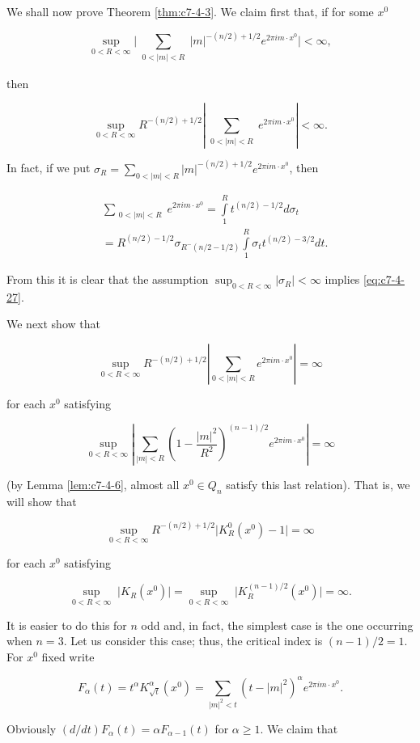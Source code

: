 We shall now prove Theorem \ref{thm:c7-4-3}. We claim first that, if for some $x^{0}$

\[
\sup_{0<R<\infty}\bigg|\sum_{\substack{0<|m|<R}}\left|m\right|^{-(n/2)+1/2}e^{2\pi i m\cdot x^{0}}\bigg|<\infty,
\]

then

\begin{equation}\label{eq:c7-4-27}
\sup_{0<R<\infty}R^{-(n/2)+1/2}\left|\sum_{\substack{0<|m|<R}}e^{2\pi i m\cdot x^{0}}\right|<\infty.
\end{equation}

In fact, if we put $\sigma_R = \sum_{0 < |m| < R} |m|^{-(n/2)+1/2}e^{2\pi im \cdot x^0}$, then

\[
\begin{aligned}&\sum_{\substack{0<|m|<R}}e^{2\pi i m\cdot x^{0}}=\int\limits_{1}^{R}t^{(n/2)-1/2}d\sigma_{t}\\&=R^{(n/2)-1/2}\sigma_{R^{-}(n/2-1/2)}\int\limits_{1}^{R}\sigma_{t}t^{(n/2)-3/2}d t.\end{aligned}
\]

From this it is clear that the assumption $\sup_{0<R<\infty}|\sigma_R|<\infty$ implies \eqref{eq:c7-4-27}.

We next show that

\[
\sup_{0<R<\infty}R^{-(n/2)+1/2}\left|\sum_{0<|m|<R}e^{2\pi i m\cdot x^{0}}\right|=\infty
\]

for each $x^{0}$ satisfying

\[
\sup_{0<R<\infty}\left|\sum_{|m|<R}\left(1-\frac{|m|^{2}}{R^{2}}\right)^{(n-1)/2}e^{2\pi im\cdot x^{0}}\right|=\infty
\]

(by Lemma \ref{lem:c7-4-6}, almost all $x^0 \in Q_n$ satisfy this last relation). That is, we will show that

\[
\sup_{0<R<\infty}R^{-(n/2)+1/2}\big|K_{R}^{0}(x^{0})-1\big|=\infty
\]

for each $x^{0}$ satisfying

\[
\sup_{0<R<\infty}\;\big|K_{R}(x^{0})\big|=\sup_{0<R<\infty}\;\big|K_{R}^{(n-1)/2}(x^{0})\big|=\infty.
\]

It is easier to do this for $n$ odd and, in fact, the simplest case is the one occurring when $n = 3$. Let us consider this case; thus, the critical index is $(n - 1)/2 = 1$. For $x^{0}$ fixed write

\[
F_{\alpha}(t)=t^{\alpha}K_{\sqrt{t}}^{\alpha}(x^{0})=\sum_{|m|^{2}<t}(t-|m|^{2})^{\alpha}e^{2\pi i m\cdot x^{0}}.
\]

Obviously $(d/dt)F_\alpha(t) = \alpha F_{\alpha-1}(t)$ for $\alpha \geq 1$. We claim that

